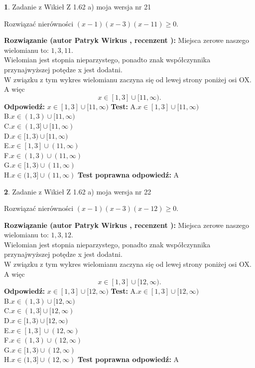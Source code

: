 \documentclass[12pt, a4paper]{article}
\theoremstyle{definition} %
\newtheorem{zad}{}
\newcommand{\zadStart}[1]{\begin{zad}#1\newline}
\newcommand{\zadStop}{\end{zad}}
\newcommand{\rozwStart}[2]{\noindent \textbf{Rozwiązanie (autor #1 , recenzent #2): }\newline}
\newcommand{\rozwStop}{\newline}
\newcommand{\odpStart}{\noindent \textbf{Odpowiedź:}\newline}
\newcommand{\odpStop}{\newline}
\newcommand{\testStart}{\noindent \textbf{Test:}\newline}
\newcommand{\testStop}{\newline}
\newcommand{\kluczStart}{\noindent \textbf{Test poprawna odpowiedź:}\newline}
\newcommand{\kluczStop}{\newline}
\begin{document}
\zadStart{Zadanie z Wikieł Z 1.62 a) moja wersja nr 21}

Rozwiązać nierówności $(x-1)(x-3)(x-11)\ge0$.
\zadStop
\rozwStart{Patryk Wirkus}{}
Miejsca zerowe naszego wielomianu to: $1, 3, 11$.\\
Wielomian jest stopnia nieparzystego, ponadto znak współczynnika przy\linebreak najwyższej potędze x jest dodatni.\\ W związku z tym wykres wielomianu zaczyna się od lewej strony poniżej osi OX. A więc $$x \in [1,3] \cup [11,\infty).$$
\rozwStop
\odpStart
$x \in [1,3] \cup [11,\infty)$
\odpStop
\testStart
A.$x \in [1,3] \cup [11,\infty)$\\
B.$x \in (1,3) \cup [11,\infty)$\\
C.$x \in (1,3] \cup [11,\infty)$\\
D.$x \in [1,3) \cup [11,\infty)$\\
E.$x \in [1,3] \cup (11,\infty)$\\
F.$x \in (1,3) \cup (11,\infty)$\\
G.$x \in [1,3) \cup (11,\infty)$\\
H.$x \in (1,3] \cup (11,\infty)$
\testStop
\kluczStart
A
\kluczStop



\zadStart{Zadanie z Wikieł Z 1.62 a) moja wersja nr 22}

Rozwiązać nierówności $(x-1)(x-3)(x-12)\ge0$.
\zadStop
\rozwStart{Patryk Wirkus}{}
Miejsca zerowe naszego wielomianu to: $1, 3, 12$.\\
Wielomian jest stopnia nieparzystego, ponadto znak współczynnika przy\linebreak najwyższej potędze x jest dodatni.\\ W związku z tym wykres wielomianu zaczyna się od lewej strony poniżej osi OX. A więc $$x \in [1,3] \cup [12,\infty).$$
\rozwStop
\odpStart
$x \in [1,3] \cup [12,\infty)$
\odpStop
\testStart
A.$x \in [1,3] \cup [12,\infty)$\\
B.$x \in (1,3) \cup [12,\infty)$\\
C.$x \in (1,3] \cup [12,\infty)$\\
D.$x \in [1,3) \cup [12,\infty)$\\
E.$x \in [1,3] \cup (12,\infty)$\\
F.$x \in (1,3) \cup (12,\infty)$\\
G.$x \in [1,3) \cup (12,\infty)$\\
H.$x \in (1,3] \cup (12,\infty)$
\testStop
\kluczStart
A
\kluczStop
\end{document}
